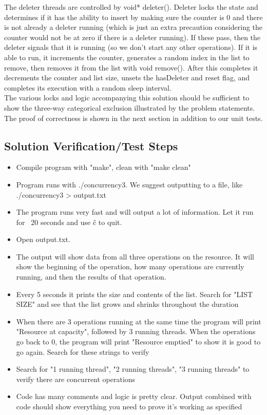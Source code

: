 \documentclass[onecolumn, draftclsnofoot,10pt, compsoc]{IEEEtran}
\begin{document}
\begin{singlespace}
    The deleter threads are controlled by void* deleter(). Deleter locks the state and determines if it has the ability to insert by making sure the counter is 0 and there is not already a deleter running (which is just an extra precaution considering the counter would not be at zero if there is a deleter running). If these pass, then the deleter signals that it is running (so we don't start any other operations). If it is able to run, it increments the counter, generates a random index in the list to remove, then removes it from the list with void remove(). After this completes it decrements the counter and list size, unsets the hasDeleter and reset flag, and completes its execution with a random sleep interval. \\
    The various locks and logic accompanying this solution should be sufficient to show the three-way categorical exclusion illustrated by the problem statements. The proof of correctness is shown in the next section in addition to our unit tests.

\subsection*{Solution Verification/Test Steps}
\begin{itemize}
    \item Compile program with "make", clean with "make clean"
    \item Program runs with ./concurrency3. We suggest outputting to a file, like ./concurrency3 > output.txt
    \item The program runs very fast and will output a lot of information. Let it run for ~20 seconds and use \^c to quit.
    \item Open output.txt.
    \item The output will show data from all three operations on the resource. It will show the beginning of the operation, how many operations are currently running, and then the results of that operation.
    \item Every 5 seconds it prints the size and contents of the list. Search for "LIST SIZE" and see that the list grows and shrinks throughout the duration
    \item When there are 3 operations running at the same time the program will print "Resource at capacity", followed by 3 running threads. When the operations go back to 0, the program will print "Resource emptied" to show it is good to go again. Search for these strings to verify
    \item Search for "1 running thread", "2 running threads", "3 running threads" to verify there are concurrent operations
    \item Code has many comments and logic is pretty clear. Output combined with code should show everything you need to prove it's working as specified
\end{itemize}


\end{singlespace}
\end{document}
